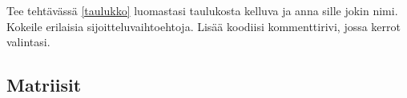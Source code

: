 %
%

\begin{fframe}
    \begin{harj}
        \label{kelluvaTaulukko}
        Tee tehtävässä \ref{taulukko} luomastasi taulukosta kelluva ja anna sille jokin nimi. Kokeile erilaisia sijoitteluvaihtoehtoja. Lisää koodiisi kommenttirivi, jossa kerrot valintasi. 
    \end{harj}
\end{fframe}


\subsection{Matriisit}

